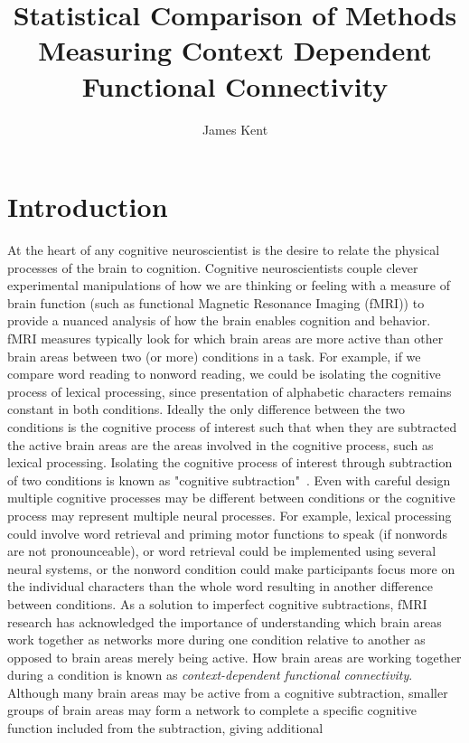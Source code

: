 \documentclass[phd,figures,tables,ackpage,abstractpage,publicabstractpage]{uithesis}
\title{Statistical Comparison of Methods Measuring Context Dependent Functional Connectivity}
\author{James Kent}
\begin{document}
\frontmatter
\chapter{Introduction}

At the heart of any cognitive neuroscientist is the desire to relate the physical
processes of the brain to cognition.
Cognitive neuroscientists couple clever experimental manipulations
of how we are thinking or feeling with a measure of brain function
(such as functional Magnetic Resonance Imaging (fMRI)) to provide a nuanced
analysis of how the brain enables cognition and behavior.
fMRI measures typically look for which brain areas are more
active than other brain areas between two (or more) conditions in a task.
For example, if we compare word reading to nonword reading, we could be isolating
the cognitive process of lexical processing, since presentation of alphabetic characters
remains constant in both conditions.
Ideally the only difference between the two conditions is the cognitive process
of interest such that when they are subtracted the active brain areas are
the areas involved in the cognitive process, such as lexical processing.
Isolating the cognitive process of interest through subtraction of two conditions
is known as "cognitive subtraction"~\cite{Sartori2000,Friston1996b}.
Even with careful design multiple cognitive processes may be
different between conditions or the cognitive process may represent multiple
neural processes.
For example, lexical processing could involve word retrieval and priming motor functions
to speak (if nonwords are not pronounceable), or word retrieval could be implemented
using several neural systems, or the nonword condition could make participants focus more
on the individual characters than the whole word resulting in another difference between conditions.
As a solution to imperfect cognitive subtractions, fMRI research has acknowledged the importance of understanding
which brain areas work together as networks more during one condition relative to another as opposed to
brain areas merely being active.
How brain areas are working together during a condition is known as
\textit{context-dependent functional connectivity}.
Although many brain areas may be active from a cognitive subtraction,
smaller groups of brain areas may form a network to complete a specific
cognitive function included from the subtraction, giving additional
\end{document}
